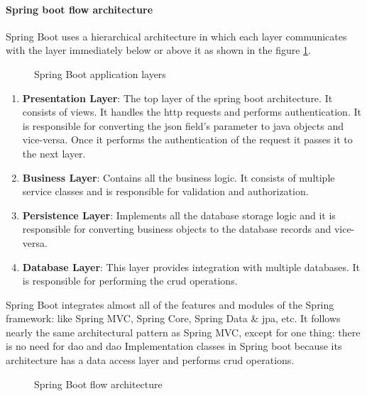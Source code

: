 \paragraph{Spring boot flow architecture} \mbox{} \newline \newline
Spring Boot uses a hierarchical architecture in which each layer communicates with the layer immediately
below or above it as shown in the figure \ref{layers}.
\begin{figure}[hbt!]
      \centering
      
      \caption{Spring Boot application layers}
      \label{layers}
\end{figure}

\begin{enumerate}
      \item \textbf{Presentation Layer}: The top layer of the spring boot architecture. It consists of views.
            It handles the \acrshort{http} requests and performs authentication. It is responsible for converting the \acrfull{json}
            field’s parameter to java objects and vice-versa. Once it performs the authentication of the request
            it passes it to the next layer.
      \item \textbf{Business Layer}: Contains all the business logic. It consists of multiple service classes
            and is responsible for validation and authorization.
      \item \textbf{Persistence Layer}: Implements all the database storage logic and it is responsible for
            converting business objects to the database records and vice-versa.
      \item \textbf{Database Layer}: This layer provides integration with multiple databases. It is
            responsible for performing the \acrshort{crud} operations.
\end{enumerate}

\noindent Spring Boot integrates almost all of the features and modules of the Spring framework: like Spring MVC,
Spring Core, Spring Data \& \acrshort{jpa}, etc. It follows nearly the same architectural pattern as
Spring MVC, except for one thing: there is no need for \acrfull{dao} and \acrshort{dao} Implementation
classes in Spring boot because its architecture has a data access layer and performs \acrshort{crud}
operations. \\


\begin{figure}[hbt!]
      \centering
      
      \caption{Spring Boot flow architecture}
      \label{flow}
\end{figure}

